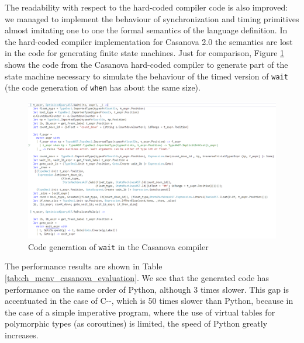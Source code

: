 The readability with respect to the hard-coded compiler code is also improved: we managed to implement the behaviour of synchronization and timing primitives almost imitating one to one the formal semantics of the language definition. In the hard-coded compiler implementation for Casanova 2.0 the semantics are lost in the code for generating finite state machines. Just for comparison, Figure \ref{fig:ch_mcnv_languages_wait_code_generation} shows the code from the Casanova hard-coded compiler to generate part of the state machine necessary to simulate the behaviour of the timed version of \texttt{wait} (the code generation of \texttt{when} has about the same size).

\begin{figure}
	\centering
	\includegraphics[angle = 90,scale= 0.6]{Figures/wait_code_casanova_compiler}
	\caption{Code generation of \texttt{wait} in the Casanova compiler}
	\label{fig:ch_mcnv_languages_wait_code_generation}
\end{figure}

The performance results are shown in Table \ref{tab:ch_mcnv_casanova_evaluation}. We see that the generated code has performance on the same order of Python, although 3 times slower. This gap is accentuated in the case of C-{}-, which is 50 times slower than Python, because in the case of a simple imperative program, where the use of virtual tables for polymorphic types (as coroutines) is limited, the speed of Python greatly increases.

